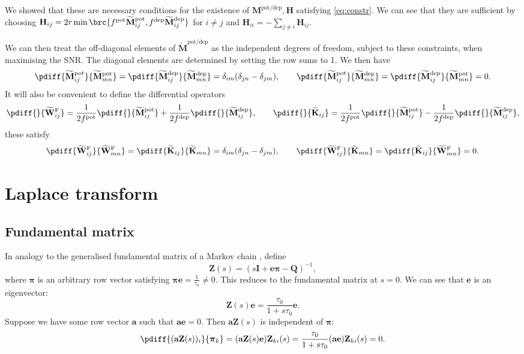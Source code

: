 \documentclass[12pt]{article}
\newcommand{\inv}{^{-1}}
\newcommand{\I}{\mathbf{I}}
\newcommand{\onev}{\mathbf{e}}
\newcommand{\MM}{\mathbf{Q}}
\newcommand{\fund}{\mathbf{Z}}
\newcommand{\pib}{\boldsymbol{\pi}}
\newcommand{\W}{\mathbf{W}}
\newcommand{\M}{\mathbf{M}}
\newcommand{\enc}{\mathbf{K}}
\newcommand{\pot}{^{\text{pot}}}
\newcommand{\dep}{^{\text{dep}}}
\newcommand{\potdep}{^{\text{pot/dep}}}
\renewcommand{\hom}{\mathbf{H}}
\newcommand{\Mh}{\widetilde{\M}}
\newcommand{\frgh}{\widetilde{\W}^{\mathrm{F}}}
\newcommand{\ench}{\widetilde{\enc}}
\begin{document}
We showed that these are necessary conditions for the existence of $\M\potdep,\hom$ satisfying \eqref{eq:constr}.
We can see that they are sufficient by choosing $\hom_{ij} = 2r\min\brc{f\pot\Mh\pot_{ij},f\dep\Mh\dep_{ij}}$ for $i \neq j$ and $\hom_{ii}=-\sum_{j \neq i} \hom_{ij}$.

We can then treat the off-diagonal elements of $\Mh\potdep$ as the independent degrees of freedom, subject to these constraints, when maximising the SNR.
The diagonal elements are determined by setting the row sums to 1.
We then have
%
\begin{equation}\label{eq:derivpd}
  \pdiff{\Mh\pot_{ij}}{\Mh\pot_{mn}{}} = \pdiff{\Mh\dep_{ij}}{\Mh\dep_{mn}{}} = \delta_{im}(\delta_{jn}-\delta_{jm}),
  \qquad
  \pdiff{\Mh\pot_{ij}}{\Mh\dep_{mn}{}} = \pdiff{\Mh\dep_{ij}}{\Mh\pot_{mn}{}} = 0.
\end{equation}
%
It will also be convenient to define the differential operators
%
\begin{equation}\label{eq:pertfe}
  \pdiff{}{\frgh_{ij}{}} = \frac{1}{2f\pot} \pdiff{}{\Mh\pot_{ij}{}} + \frac{1}{2f\dep} \pdiff{}{\Mh\dep_{ij}{}},
  \qquad
  \pdiff{}{\ench_{ij}{}} = \frac{1}{2f\pot} \pdiff{}{\Mh\pot_{ij}{}} - \frac{1}{2f\dep} \pdiff{}{\Mh\dep_{ij}{}},
\end{equation}
%
these satisfy
%
\begin{equation}\label{eq:derivfe}
  \pdiff{\frgh_{ij}}{\frgh_{mn}{}} = \pdiff{\ench_{ij}}{\ench_{mn}{}} = \delta_{im}(\delta_{jn}-\delta_{jm}),
  \qquad
  \pdiff{\frgh_{ij}}{\ench_{mn}{}} = \pdiff{\ench_{ij}}{\frgh_{mn}{}} = 0.
\end{equation}
%



\section{Laplace transform}\label{sec:laplace}

\subsection{Fundamental matrix \etc}\label{sec:lfund}

In analogy to the generalised fundamental matrix of a Markov chain \cite{Kemeny1981fund}, define
%
\begin{equation}\label{eq:lfund}
  \fund(s) = (s\I +\onev\pib -\MM)\inv,
\end{equation}
%
where $\pib$ is an arbitrary row vector satisfying $\pib\onev = \frac{1}{\tau_0} \neq 0$.
This reduces to the fundamental matrix at $s=0$.
We can see that $\onev$ is an eigenvector:
%
\begin{equation}\label{eq:lfundrowsum}
  \fund(s)\onev = \frac{\tau_0}{1+s\tau_0}\onev.
\end{equation}
%
Suppose we have some row vector $\mathbf{a}$ such that $\mathbf{a}\onev=0$.
Then $\mathbf{a}\fund(s)$ is independent of $\pib$:
%
\begin{equation}\label{eq:alfund}
  \pdiff{(\mathbf{a}\fund(s))_i}{\pib_k} = (\mathbf{a}\fund(s)\onev) \fund_{ki}(s) 
      = \frac{\tau_0}{1+s\tau_0} (\mathbf{a}\onev) \fund_{ki}(s) = 0.
\end{equation}
%
\end{document}
